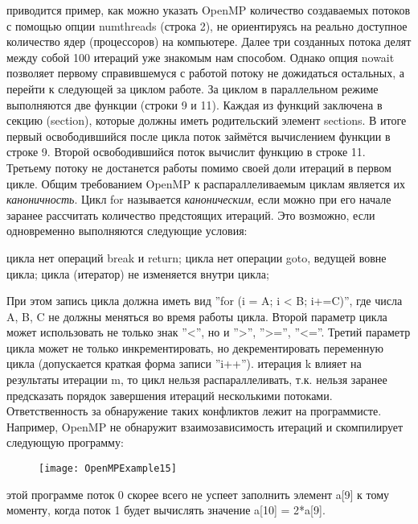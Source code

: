 {\begin{figure}[H]
	\end{figure}
	 приводится пример, как можно указать OpenMP количество создаваемых потоков с помощью опции num\textunderscore threads (строка 2), не ориентируясь на реально доступное количество ядер (процессоров) на компьютере. Далее три созданных потока делят между собой 100 итераций уже знакомым нам способом. Однако опция nowait позволяет первому справившемуся с работой потоку не дожидаться остальных, а перейти к следующей за циклом работе. За циклом в параллельном режиме выполняются две функции (строки 9 и 11). Каждая из функций заключена в секцию (section), которые должны иметь родительский элемент sections. В итоге первый освободившийся после цикла поток займётся вычислением функции в строке 9. Второй освободившийся поток вычислит функцию в строке 11. Третьему потоку не достанется работы помимо своей доли итераций в первом цикле.
Общим требованием OpenMP к распараллеливаемым циклам является их \textit{каноничность}. Цикл for называется \textit{каноническим}, если можно при его начале заранее рассчитать количество предстоящих итераций. Это возможно, если одновременно выполняются следующие условия:
	\begin{itemize}
		 цикла нет операций break и return;
		 цикла нет операции goto, ведущей вовне цикла;
		 цикла (итератор) не изменяется внутри цикла;
	\end{itemize}
	При этом запись цикла должна иметь вид ''for (i = A; i < B; i+=C)'', где числа A, B, C не должны меняться во время работы цикла. Второй параметр цикла может использовать не только знак ''<'', но и  ''>'',  ''>='',  ''<=''. Третий параметр цикла может не только инкрементировать, но декрементировать переменную цикла (допускается краткая форма записи ''i++'').
	 итерация k влияет на результаты итерации m, то цикл нельзя распараллеливать, т.к. нельзя заранее предсказать порядок завершения итераций несколькими потоками.  Ответственность за обнаружение таких конфликтов лежит на программисте. Например, OpenMP не обнаружит взаимозависимость итераций и скомпилирует следующую программу:
	\begin{figure}[H]
		\texttt{[image: OpenMPExample15]}
	\end{figure}
	 этой программе поток 0 скорее всего не успеет заполнить элемент a[9] к тому моменту, когда поток 1 будет вычислять значение a[10] = 2*a[9].
	\par
}